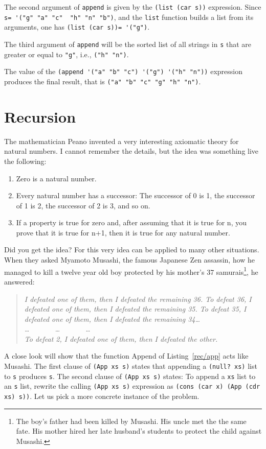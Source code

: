 \documentclass[a4paper,12pt]{book}
\begin{document}
The second argument of \verb|append| is
given by the \verb|(list (car s))| expression.
Since \verb|s= '("g" "a" "c"  "h" "n" "b")|,
and the \verb|list| function builds a list
from its arguments, one
has \verb|(list (car s))= '("g")|.

The third argument of \verb|append| will
be the sorted list of all strings in \verb|s|
that are greater or equal to \verb|"g"|,
i.e., \verb|("h" "n")|.

The value of the \verb|(append '("a" "b" "c") '("g") '("h" "n"))|
expression produces the final result, that is
\verb|("a" "b" "c" "g" "h" "n")|.

\chapter{Recursion}\label{chapter:Recursion}
The mathematician Peano invented a very interesting axiomatic theory for
natural numbers. I cannot remember the details, but the idea was
something live the following:
\begin{enumerate}
\item Zero is a natural number.
\item Every natural number has a successor: The successor of 0 is 1, the
successor of 1 is 2, the successor of 2 is 3, and so on.
\item If a property is true for zero and, after assuming that it is true for n,
you prove that it is true for n+1, then it is true for any natural number.
\end{enumerate}
Did you get the idea? For this very idea can be applied to many other
situations. When they asked Myamoto Musashi, the famous Japanese
Zen assassin, how he managed to kill a twelve year old boy protected by his
mother's 37 samurais\footnote{The boy's father had been killed by Musashi. His uncle met the the same fate. His
mother  hired her late husband's students to protect the child against Musashi.}, he answered:
\begin{quote} \em
I defeated one of them, then I defeated
the remaining 36. To defeat 36, I defeated one of them, then I defeated
the remaining 35. To defeat 35, I defeated one of them, then I defeated the
remaining 34\ldots \\
\ldots~~~~~~~\ldots~~~~~~~\ldots\\
 To defeat 2, I defeated one of them, then I defeated the other.
\end{quote}
A close look will show that 
the function 
Append of Listing~\ref{rec/app} acts like
Musashi. The first
clause of \verb|(App xs s)| states that
appending a \verb|(null? xs)| list to
\verb|s| produces \verb|s|. The second 
clause of \verb|(App xs s)|  states: To
append a \verb|xs| list to an \verb|s| list,
 rewrite the calling 
\verb|(App xs s)| expression
 as \verb|(cons (car x) (App (cdr xs) s))|.
Let us pick a more concrete instance of the problem.
\end{document}
